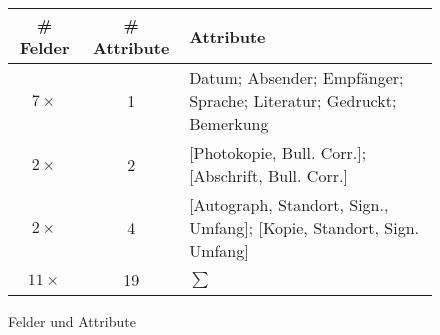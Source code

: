 \begin{figure}[H]
\centering
\begin{footnotesize}
\begin{tabular}{ccl}
\toprule
\# Felder & \# Attribute & Attribute\\
\midrule
$7\times$	&	1 & Datum; Absender; Empfänger; Sprache; Literatur; Gedruckt; Bemerkung \\
$2\times$	&	2 & [Photokopie, Bull. Corr.]; [Abschrift, Bull. Corr.]\\
$2\times$	& 	4 & [Autograph, Standort, Sign., Umfang]; [Kopie, Standort, Sign. Umfang]\\
\midrule
$11\times$	&	19 & $\sum$\\
\bottomrule
\end{tabular}
\end{footnotesize}
\caption{Felder und Attribute}
\end{figure}